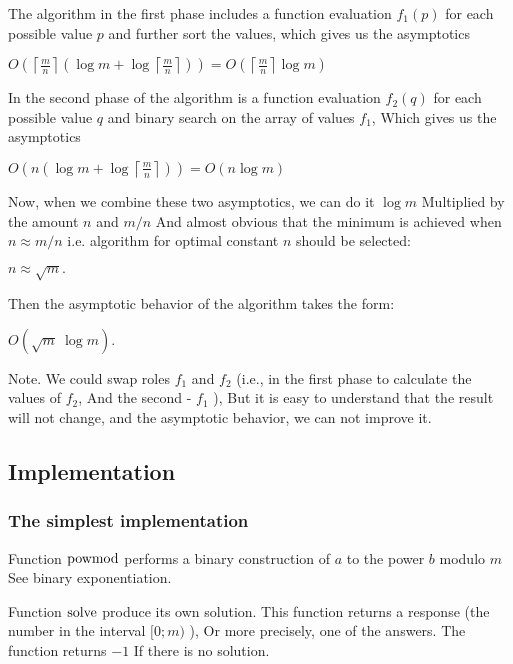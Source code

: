 The algorithm in the first phase includes a function evaluation $f_1 (p)$ for each possible value $p$ and further sort the values, which gives us the asymptotics

$O\left(\left\lceil \frac{m}{n}\right\rceil \left(\log m+\log\left\lceil \frac{m}{n}\right\rceil \right)\right)=O\left(\left\lceil \frac{m}{n}\right\rceil \log m\right)$

In the second phase of the algorithm is a function evaluation $f_2 (q)$ for each possible value $q$ and binary search on the array of values $f_1$, Which gives us the asymptotics

$O\left(n\left(\log m+\log\left\lceil \frac{m}{n}\right\rceil \right)\right)=O\left(n\log m\right)$

Now, when we combine these two asymptotics, we can do it $\log m$ Multiplied by the amount $n$ and $m / n$ And almost obvious that the minimum is achieved when $n \approx m / n$ i.e. algorithm for optimal constant $n$ should be selected:

$n \approx \sqrt {m}.$

Then the asymptotic behavior of the algorithm takes the form:

$O \left (\sqrt {m} ~ \log m \right).$

Note. We could swap roles $f_1$ and $f_2$ (i.e., in the first phase to calculate the values ​​of $f_2$, And the second - $f_1$ ), But it is easy to understand that the result will not change, and the asymptotic behavior, we can not improve it.

\subsection{ Implementation }

\subsubsection{ The simplest implementation }

Function $\rm powmod$ performs a binary construction of $a$ to the power $b$ modulo $m$ See binary exponentiation.

Function $\rm solve$ produce its own solution. This function returns a response (the number in the interval $[0; m)$ ), Or more precisely, one of the answers. The function returns $-1$ If there is no solution.

